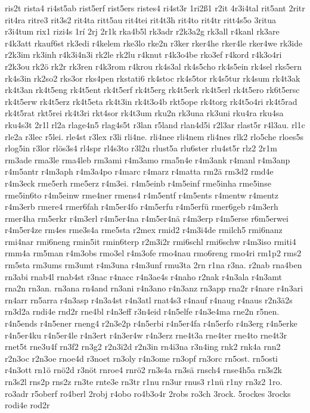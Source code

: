 {ris2t
rista4
ri4st5ab
rist5erf
rist5ers
ristes4
ri4st3r
1ri2ß1
r2it
4r3i4tal
rit5ant
2ritr
rit4ra
ritre3
rit3s2
rit4ta
ritt5au
rit4tei
rit4t3h
rit4to
rit4tr
ritt4s5o
3ritua
r3i4tum
rix1
rizi4s
1rí
2rj
2r1k
rka4b5l
rk3adr
r2k3a2g
rk3all
r4kanl
rk3are
r4k3att
rkauf6st
rk3edi
r4kelem
rke3lo
rke2n
r3ker
rker4he
rker4le
rker4we
rk3ide
r2k3im
rk3inh
r4k3i4n3i
rk2le
rk2lu
r4knut
r4k3o4be
rko3ef
r4kord
r4k3o4ri
r2k3ou
rk2ö
rk2r
rk3ren
r4k3rom
r4krou
rk4s3al
rk4s5cho
rk4s5ein
rk4sel
rks5ern
rk4s3in
rk2so2
rks3or
rks4pen
rkstati6
rk4stoc
rk4s5tor
rk4s5tur
rk4sum
rk4t3ak
rk4t3an
rk4t5eng
rk4t5ent
rk4t5erf
rk4t5erg
rk4t5erk
rk4t5erl
rk4t5ero
rk6t5ersc
rk4t5erw
rk4t5erz
rk4t5eta
rk4t3in
rk4t3o4b
rkt5ope
rk4torg
rk4t5o4ri
rk4t5rad
rk4t5rat
rkt5rei
rk4t3ri
rkt4sor
rk4t3um
rku2n
rk3una
rk3uni
rku4ra
rku4sa
rku4s3t
2r1l
rl2a
rlage4n5
rlag4s5t
r3lan
r5land
rlan4d5i
r2l3ar
rlast5r
r4l3au.
rl1c
rle2a
r3lec
r5lei.
rle4st
r3lex
r3li
rli4ne.
rli4nee
rli4nem
rli4nes
rlk2
rlo5che
rloes5s
rlog5in
r3lor
rlös3s4
rl4spr
rl4s3to
r3l2u
rlust5a
rlu6ster
rlu4st5r
rlz2
2r1m
rm3ade
rma3le
rma4leb
rm3ami
r4m3amo
rma5n4e
r4m3ank
r4manl
r4m3anp
r4m5antr
r4m3aph
r4m3a4po
r4marc
r4marz
r4matta
rm2ä
rm3d2
rmd4e
r4m3eck
rme5erh
rme5erz
r4m3ei.
r4m5einb
r4m5einf
rme5inha
rme5inse
rme5in6to
r4m5einw
rme4ner
rmens4
r4m5entf
r4m5ents
r4mentw
r4mentz
r4m3erb
rmere4
rmer6fah
r4m5er4fo
r4m5erfu
r4m5erfü
rmer6geb
r4m3erh
rmer4ha
rm5erkr
r4m3erl
r4m5er4na
r4m5er4nä
r4m3erp
r4m5erse
r6m5erwei
r4m5er4ze
rm4es
rme3s4a
rme5sta
r2mex
rmid2
r4m3i4de
rmilch5
rmi6nanz
rmi4nar
rmi6neng
rmin5it
rmin6terp
r2m3i2r
rmi6schl
rmi6schw
r4m3iso
rmiti4
rmm4a
rm5man
r4m3obs
rmo3el
r4m3ofe
rmo4nau
rmo6reng
rmo4ri
rm1p2
rms2
rm5sta
rm3ums
rm3umt
r4m3una
r4m3unf
rmu3ta
2rn
r1na
r3na.
r2nab
rna4ben
rn3abi
rnab4l
rnab4st
r3nac
r4nacc
r4n3ae4s
r4naho
r2nak
r4n3ala
r4n3amt
rna2n
rn3an.
rn3ana
rn4and
rn3ani
r4n3ano
r4n3anz
rn3app
rna2r
r4nare
r4n3ari
rn4arr
rn5arra
r4n3asp
r4n3a4st
r4n3atl
rnat4s3
r4nauf
r4naug
r4naus
r2n3ä2s
rn3d2a
rndi4e
rnd2r
rne4bl
r4n3eff
r3n4eid
r4n5elfe
r4n3e4ma
rne2n
r5nen.
r4n5ends
r4n5ener
rneng4
r2n3e2p
r4n5erbi
r4n5er4fa
r4n5erfo
r4n3erg
r4n5erke
r4n5er4ku
r4n5er4le
r4n3ert
r4n3er4w
r4n3erz
rne4t3a
rne4ter
rne4to
rne4t3r
rnet5t
rne3u4f
rn3f2
rn3g2
r2n3i2d
r2n3in
rn4i3na
r3n4ing
rnk2
rnk4a
rnn2
r2n3oc
r2n3oe
rnoe4d
r3noet
rn3oly
r4n3ome
rn3opf
rn3orc
rn5ost.
rn5osti
r4n3ott
rn1ö
rnö2d
r3nöt
rnroe4
rnrö2
rn3s4a
rn3sä
rnsch4
rnse4h5a
rn3s2k
rn3s2l
rns2p
rns2z
rn3te
rnte3e
rn3tr
r1nu
rn3ur
rnus3
r1nü
r1ny
rn3z2
1ro.
ro3adr
r5oberf
ro4berl
2robj
r4obo
ro4b3o4r
2robs
ro3ch
3rock.
5rockes
3rocks
rodi4e
rod2r
}

